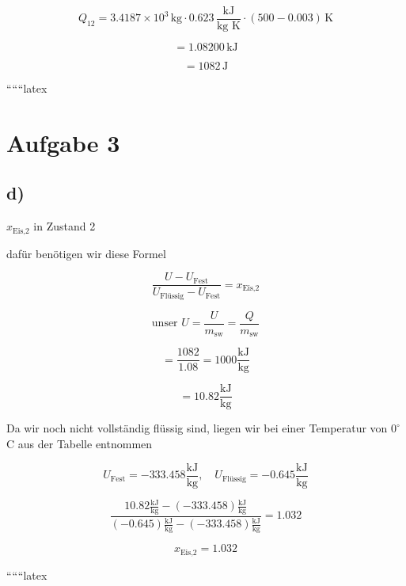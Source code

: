 \[
Q_{12} = 3.4187 \times 10^3 \, \text{kg} \cdot 0.623 \, \frac{\text{kJ}}{\text{kg K}} \cdot (500 - 0.003) \, \text{K}
\]

\[
= 1.08200 \, \text{kJ}
\]

\[
= 1082 \, \text{J}
\]

``````latex


\section*{Aufgabe 3}

\subsection*{d)}
$x_{\text{Eis,2}}$ in Zustand 2

dafür benötigen wir diese Formel

\[
\frac{U - U_{\text{Fest}}}{U_{\text{Flüssig}} - U_{\text{Fest}}} = x_{\text{Eis,2}}
\]

\[
\text{unser } U = \frac{U}{m_{\text{sw}}} = \frac{Q}{m_{\text{sw}}}
\]

\[
= \frac{1082}{1.08} = 1000 \frac{\text{kJ}}{\text{kg}}
\]

\[
= 10.82 \frac{\text{kJ}}{\text{kg}}
\]

Da wir noch nicht vollständig flüssig sind, liegen wir bei einer Temperatur von $0^\circ$C aus der Tabelle entnommen

\[
U_{\text{Fest}} = -333.458 \frac{\text{kJ}}{\text{kg}}, \quad U_{\text{Flüssig}} = -0.645 \frac{\text{kJ}}{\text{kg}}
\]


\[
\frac{10.82 \frac{\text{kJ}}{\text{kg}} - (-333.458) \frac{\text{kJ}}{\text{kg}}}{(-0.645) \frac{\text{kJ}}{\text{kg}} - (-333.458) \frac{\text{kJ}}{\text{kg}}} = 1.032
\]


\[
x_{\text{Eis,2}} = 1.032
\]

``````latex


